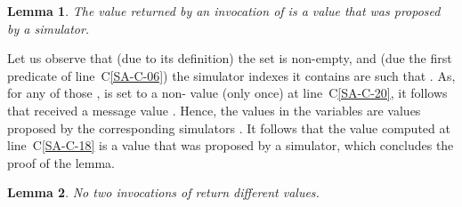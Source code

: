 \documentclass[11pt,letterpaper]{article}
\newtheorem{lemma}{Lemma}
\newlength {\afterproof}
\newcommand{\toto}{xxx}
\newenvironment{proofL}{\noindent{\bf Proof }}
{\hspace*{\fill}\par\vspace{\afterproof}}
\begin{document}
\begin{lemma}
\label{lemma:safe-agr-validity}
The value returned by an invocation of  is a value
that was  proposed by a simulator.
\end{lemma}

\begin{proofL}
Let us observe that (due to its definition) the  set 
is non-empty, and (due the first predicate of line~C\ref{SA-C-06})
the simulator indexes  it contains are such that .
As, for any of those ,   is set to a non- value (only
once) at line~C\ref{SA-C-20}, it follows that  received a message
{\sc value} . Hence, the values in the  variables  
are values proposed by the corresponding simulators .
It follows that the value computed at line~C\ref{SA-C-18} is a value that
was proposed by a simulator, which concludes the proof of the lemma.
\renewcommand{\toto}{lemma:safe-agr-validity}
\end{proofL}

\begin{lemma}
\label{lemma:safe-agr-agreement}
No two invocations of  return different values.
\end{lemma}
\end{document}

